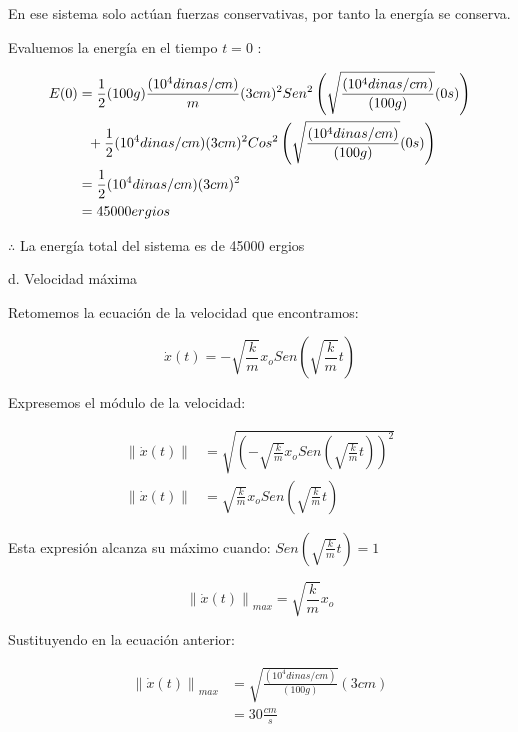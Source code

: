 En ese sistema solo actúan fuerzas conservativas, por tanto la energía se conserva.

Evaluemos la energía en el tiempo $t=0$ :

\begin{align*}
    E(0)&=\frac{1}{2} (100 g) \frac{( 10^{4} dinas/cm )}{m} (3cm)^{2} Sen^{2} \left(  \sqrt{ \frac{( 10^{4} dinas/cm )}{(100 g)} } (0s) \right) \\
        &\hspace{0.23cm}+ \frac{1}{2} ( 10^{4} dinas/cm ) (3cm)^{2} Cos^{2} \left( \sqrt{ \frac{( 10^{4} dinas/cm )}{(100 g)} } (0s) \right) \\
        &= \frac{1}{2} ( 10^{4} dinas/cm ) (3cm)^{2} \\
        &= 45000 ergios
\end{align*}

$\therefore$ La energía total del sistema es de 45000 ergios


d. Velocidad máxima

Retomemos la ecuación de la velocidad que encontramos:

\begin{equation*}
    \dot{x}(t) = - \sqrt{ \frac{k}{m} } x_{o} Sen \left(  \sqrt{ \frac{k}{m} } t \right)
\end{equation*}

Expresemos el módulo de la velocidad:

\begin{align*}
    \left\lVert \dot{x}(t) \right\rVert &= \sqrt{ \left( - \sqrt{ \frac{k}{m} } x_{o} Sen \left(  \sqrt{ \frac{k}{m} } t \right) \right)^{2} } \\
    \left\lVert \dot{x}(t) \right\rVert &= \sqrt{ \frac{k}{m} } x_{o} Sen \left(  \sqrt{ \frac{k}{m} } t \right)
\end{align*}

Esta expresión alcanza su máximo cuando: $ Sen \left(  \sqrt{ \frac{k}{m} } t \right) = 1 $

\begin{equation*}
    \left\lVert \dot{x}(t) \right\rVert_{max} = \sqrt{ \frac{k}{m} } x_{o}
\end{equation*}

Sustituyendo en la ecuación anterior:

\begin{align*}
    \left\lVert \dot{x}(t) \right\rVert_{max} &= \sqrt{ \frac{( 10^{4} dinas/cm )}{(100 g)} } (3cm) \\
                                              &= 30 \frac{cm}{s}  
\end{align*}

